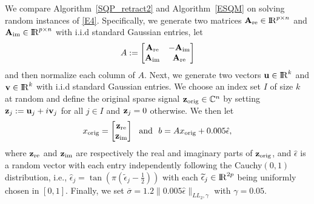 \documentclass[10pt]{article}
\numberwithin{equation}{section}
\def\R{{\rm I\!R}}
\def\xorig{{x_{\rm orig}}}
\begin{document}
{\color{blue}We compare Algorithm~\ref{SQP_retract2} and Algorithm~\ref{ESQM} on solving random instances of \eqref{E4}. Specifically, we generate two matrices ${\bf A}_{\rm re}\in \R^{p\times n}$ and ${\bf A}_{\rm im}\in \R^{p\times n}$ with i.i.d standard Gaussian entries, let
\begin{equation*}
A := \left[ \begin{matrix}
{\bf A}_{\rm re} & -{\bf A}_{\rm im}\\
{\bf A}_{\rm im} & {\bf A}_{\rm re}
\end{matrix} \right]
\end{equation*}
and then normalize each column of $A$. Next, we generate two vectors ${\bf u}\in\R^k$ and ${\bf v}\in\R^k$ with i.i.d standard Gaussian entries. We choose an index set $I$ of size $k$ at random and define the original sparse signal ${\bf z}_{\rm orig}\in {\mathbb{C}}^{n}$ by setting ${\bf z}_j := {\bf u}_j + i {\bf v}_j$ for all $j \in I$ and ${\bf z}_j = 0$ otherwise. We then let
\[
\xorig = \begin{bmatrix}
  {\bf z}_{\rm re}\\
  {\bf z}_{\rm im}
\end{bmatrix}\ \ {\rm and}\ \ b = A\xorig + 0.005\hat{\epsilon},
\]
where ${\bf z}_{\rm re}$ and ${\bf z}_{\rm im}$ are respectively the real and imaginary parts of ${\bf z}_{\rm orig}$, and $\hat{\epsilon}$ is a random vector with each entry independently following the Cauchy$(0, 1)$ distribution, i.e., $\hat{\epsilon}_{j} = \tan(\pi(\widetilde{\epsilon}_j - \frac{1}{2}))$ with each $\widetilde{\epsilon}_j\in\R^{2p}$ being uniformly chosen in $[0, 1]$. Finally, we set $\overline{\sigma} = 1.2\|0.005\hat{\epsilon}\|_{LL_2,\gamma}$ with $\gamma = 0.05$.}

\end{document}
